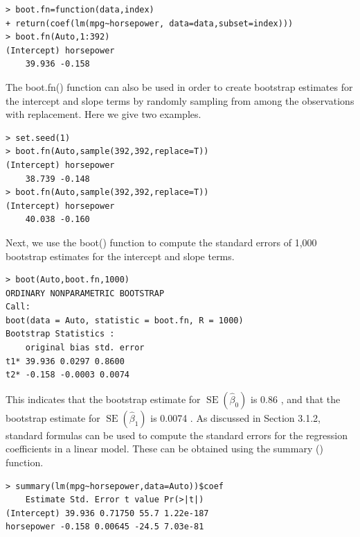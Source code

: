 \documentclass[10pt]{article}
\begin{document}
\begin{verbatim}
> boot.fn=function(data,index)
+ return(coef(lm(mpg~horsepower, data=data,subset=index)))
> boot.fn(Auto,1:392)
(Intercept) horsepower
    39.936 -0.158
\end{verbatim}

The boot.fn() function can also be used in order to create bootstrap estimates for the intercept and slope terms by randomly sampling from among the observations with replacement. Here we give two examples.

\begin{verbatim}
> set.seed(1)
> boot.fn(Auto,sample(392,392,replace=T))
(Intercept) horsepower
    38.739 -0.148
> boot.fn(Auto,sample(392,392,replace=T))
(Intercept) horsepower
    40.038 -0.160
\end{verbatim}

Next, we use the boot() function to compute the standard errors of 1,000 bootstrap estimates for the intercept and slope terms.

\begin{verbatim}
> boot(Auto,boot.fn,1000)
ORDINARY NONPARAMETRIC BOOTSTRAP
Call:
boot(data = Auto, statistic = boot.fn, R = 1000)
Bootstrap Statistics :
    original bias std. error
t1* 39.936 0.0297 0.8600
t2* -0.158 -0.0003 0.0074
\end{verbatim}

This indicates that the bootstrap estimate for $\operatorname{SE}\left(\hat{\beta}_{0}\right)$ is 0.86 , and that the bootstrap estimate for $\operatorname{SE}\left(\hat{\beta}_{1}\right)$ is 0.0074 . As discussed in Section 3.1.2, standard formulas can be used to compute the standard errors for the regression coefficients in a linear model. These can be obtained using the summary () function.

\begin{verbatim}
> summary(lm(mpg~horsepower,data=Auto))$coef
    Estimate Std. Error t value Pr(>|t|)
(Intercept) 39.936 0.71750 55.7 1.22e-187
horsepower -0.158 0.00645 -24.5 7.03e-81
\end{verbatim}
\end{document}
